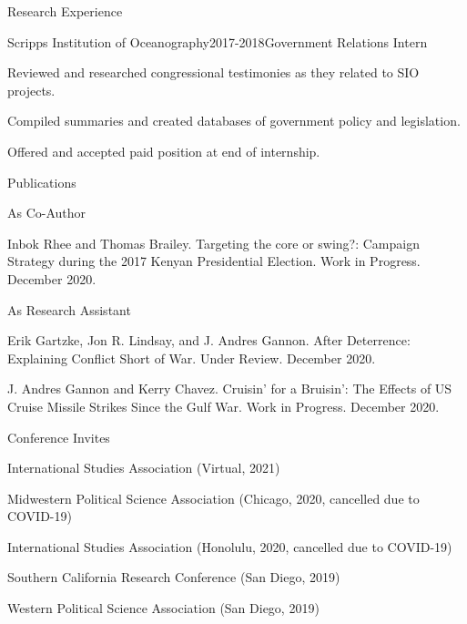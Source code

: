 \documentclass[10pt]{resume} %
\begin{document}
\begin{rSection}{Research Experience}
		\begin{rSubsection}{Scripps Institution of Oceanography}{2017-2018}{Government Relations Intern}{}
			\item Reviewed and researched congressional testimonies as they related to SIO projects.
			\item Compiled summaries and created databases of government policy and legislation.
			\item Offered and accepted paid position at end of internship.
		\end{rSubsection}
		
	\end{rSection}
	
	
	\begin{rSection}{Publications}\itemsep -5pt
		\begin{rSubsection}{As Co-Author}{}{}{}
		\item	Inbok Rhee and Thomas Brailey. Targeting the core or swing?: Campaign Strategy during the 2017 Kenyan Presidential Election. Work in Progress. December 2020.
		\end{rSubsection}
		\begin{rSubsection}{As Research Assistant}{}{}{}
		\item	Erik Gartzke, Jon R. Lindsay, and J. Andres Gannon. After Deterrence: Explaining Conflict Short of War. Under Review. December 2020. 
		\item	J. Andres Gannon and Kerry Chavez. Cruisin’ for a Bruisin’: The Effects of US Cruise Missile Strikes Since the Gulf War. Work in Progress. December 2020.
		\end{rSubsection}
	
	\end{rSection}
	
	\newpage
	\bigskip
	\begin{rSection}{Conference Invites}
		\itemsep -5pt
		\item International Studies Association (Virtual, 2021)
		\item Midwestern Political Science Association (Chicago, 2020, cancelled due to COVID-19)
		\item International Studies Association (Honolulu, 2020, cancelled due to COVID-19)
		\item Southern California Research Conference (San Diego, 2019)
		\item Western Political Science Association (San Diego, 2019)
	\end{rSection}
	
\end{document}
